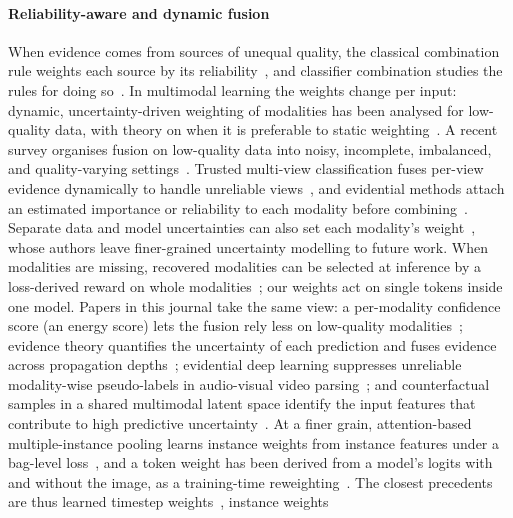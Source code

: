 \paragraph*{Reliability-aware and dynamic fusion}
When evidence comes from sources of unequal quality, the classical combination rule weights each source by its
reliability~\cite{chair1986optimal}, and classifier combination studies the rules for doing so~\cite{kittler1998combining}.
In multimodal learning the weights change per input: dynamic, uncertainty-driven weighting of modalities has been analysed for
low-quality data, with theory on when it is preferable to static weighting~\cite{zhang2023provable}. A recent survey organises fusion on low-quality data into noisy, incomplete, imbalanced, and
quality-varying settings~\cite{zhang2026lowquality}.
Trusted multi-view classification fuses per-view evidence dynamically to handle unreliable views~\cite{han2023trusted}, and evidential
methods attach an estimated importance or reliability to each modality before combining~\cite{shao2024ddef,huang2025evidential,han2026aemrl}.
Separate data and model uncertainties can also set each modality's weight~\cite{guo2026dmmf}, whose authors leave finer-grained
uncertainty modelling to future work.
When modalities are missing, recovered modalities can be selected at inference by a loss-derived reward on whole
modalities~\cite{du2026dymo}; our weights act on single tokens inside one model.
Papers in this journal take the same view: a per-modality confidence score (an energy score) lets the fusion rely less on low-quality
modalities~\cite{li2026tcpfmc}; evidence theory quantifies the uncertainty of each prediction and fuses evidence across propagation
depths~\cite{chen2025uncertainty}; evidential deep learning suppresses unreliable modality-wise pseudo-labels in audio-visual video
parsing~\cite{jiang2025resisting}; and counterfactual samples in a shared multimodal latent space identify the input features that
contribute to high predictive uncertainty~\cite{qiu2025counterfactual}.
At a finer grain, attention-based multiple-instance pooling learns instance weights from instance features under a bag-level
loss~\cite{ilse2018attention}, and a token weight has been derived from a model's logits with and without the image, as a training-time
reweighting~\cite{xiao2024seeing}.
The closest precedents are thus learned timestep weights~\cite{clark2023zeroshot,jeong2025diffusion}, instance weights
